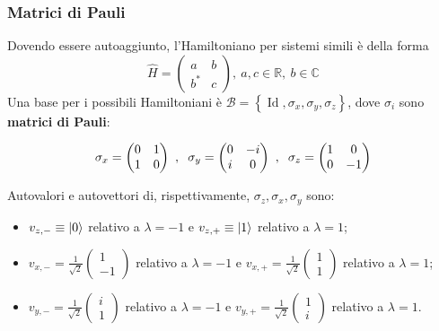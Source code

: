\documentclass[10pt, a4paper]{scrartcl} %
\numberwithin{equation}{subsection}
\theoremstyle{style2}
\theoremstyle{style1}
\newenvironment{boxenv}[1][]{
    \begin{eqbox}[#1]
    }{
   \end{eqbox}
}
\begin{document}
\subsubsection{Matrici di Pauli}
Dovendo essere autoaggiunto, l'Hamiltoniano per sistemi simili \`e della forma
\begin{equation}
	\hat{H} = \begin{pmatrix} a & b \\ b^* & c\end{pmatrix}, \ a,c \in \mathbb{R}, \ b \in \mathbb{C}
\end{equation}
Una base per i possibili Hamiltoniani \`e $\mathcal{B} = \left\{ \operatorname{Id} , \sigma_x, \sigma _y, \sigma _z \right\} $, dove $\sigma _i$ sono \textbf{matrici di Pauli}:
\begin{boxenv}[]
\begin{equation}
	\sigma _x = \begin{pmatrix} 0 & 1 \\ 1& 0 \end{pmatrix} \ , \hspace{.2cm} \sigma _y = \begin{pmatrix} 0 & - i \\ i & 0  \end{pmatrix} \ , \hspace{.2cm} \sigma _z = \begin{pmatrix} 1& 0 \\ 0&  -1 \end{pmatrix} 
\end{equation}
\end{boxenv}
\noindent Autovalori e autovettori di, rispettivamente, $\sigma _z, \sigma _x, \sigma _y$ sono:
\begin{itemize}
	\item $v_{z,-}\equiv \ket{0} $ relativo a $\lambda =-1$ e $v_{z,+} \equiv\ket{1} $ relativo a $\lambda = 1$;
	\item $v_{x,-} = \displaystyle \frac{1}{\sqrt{2} } \begin{pmatrix} 1 \\ -1 \end{pmatrix} $ relativo a $\lambda=-1$ e $v_{x,+} = \displaystyle \frac{1}{\sqrt{2} }\begin{pmatrix} 1 \\ 1 \end{pmatrix}  $ relativo a $\lambda = 1$;
	\item $v_{y,-} = \displaystyle \frac{1}{\sqrt{2} }\begin{pmatrix} i \\ 1 \end{pmatrix} $ relativo a $\lambda  = -1$ e $v_{y,+} = \displaystyle \frac{1}{\sqrt{2} } \begin{pmatrix} 1 \\ i \end{pmatrix} $ relativo a $\lambda  = 1 $.
\end{itemize}
\end{document}
